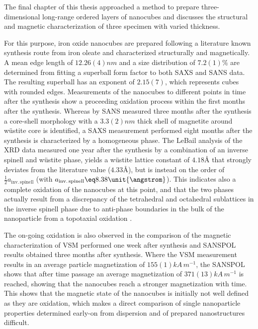 \documentclass[\main/dresen_thesis.tex]{subfiles}
\begin{document}
  \label{sec:colloidalCrystals:colloidalCrystals:summary}
  The final chapter of this thesis approached a method to prepare three-dimensional long-range ordered layers of nanocubes and discusses the structural and magnetic characterization of three specimen with varied thickness.

  For this purpose, iron oxide nanocubes are prepared following a literature known synthesis route from iron oleate and characterized structurally and magnetically.
  A mean edge length of $12.26(4) \unit{nm}$ and a size distribution of $7.2(1) \%$ are determined from fitting a superball form factor to both SAXS and SANS data.
  The resulting superball has an exponent of $2.15(7)$, which represents cubes with rounded edges.
  Measurements of the nanocubes to different points in time after the synthesis show a proceeding oxidation process within the first months after the synthesis.
  Whereas by SANS measured three months after the synthesis a core-shell morphology with a $3.3(2) \unit{nm}$ thick shell of magnetite around w\"ustite core is identified, a SAXS measurement performed eight months after the synthesis is characterized by a homogeneous phase.
  The LeBail analysis of the XRD data measured one year after the synthesis by a combination of an inverse spinell and w\"ustite phase, yields a w\"ustite lattice constant of $4.18 \unit{\angstrom}$ that strongly deviates from the literature value ($4.33 \unit{\angstrom}$), but is instead on the order of $\tfrac{1}{2} a_\mathrm{inv.\,spinell}$ (with $a_\mathrm{inv.\,spinell} \eq 8.38 \unit{\angstrom}$).
  This indicates also a complete oxidation of the nanocubes at this point, and that the two phases actually result from a discrepancy of the tetrahedral and octahedral sublattices in the inverse spinell phase due to anti-phase boundaries in the bulk of the nanoparticle from a topotaxial oxidation \cite{Wetterskog_2013_Anoma}.

  The on-going oxidation is also observed in the comparison of the magnetic characterization of VSM performed one week after synthesis and SANSPOL results obtained three months after synthesis.
  Where the VSM measurement results in an average particle magnetization of $155(1) \unit{kA\, m^{-1}}$, the SANSPOL shows that after time passage an average magnetization of $371(13) \unit{kA \, m^{-1}}$ is reached, showing that the nanocubes reach a stronger magnetization with time.
  This shows that the magnetic state of the nanocubes is initially not well defined as they are oxidation, which makes a direct comparison of single nanoparticle properties determined early-on from dispersion and of prepared nanostructures difficult.
  \\
\end{document}
